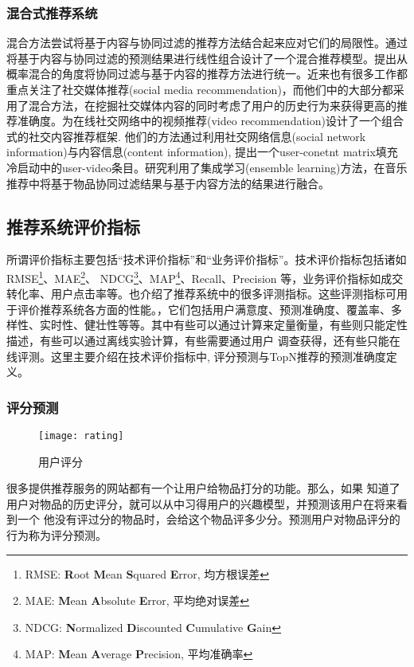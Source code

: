 \subsubsection{混合式推荐系统}
混合方法尝试将基于内容与协同过滤的推荐方法结合起来应对它们的局限性。\cite{burke2007hybrid}通过将基于内容与协同过滤的预测结果进行线性组合设计了一个混合推荐模型。\cite{schein2002methods}提出从概率混合的角度将协同过滤与基于内容的推荐方法进行统一。近来也有很多工作都重点关注了社交媒体推荐(social media recommendation)，而他们中的大部分都采用了混合方法，在挖掘社交媒体内容的同时考虑了用户的历史行为来获得更高的推荐准确度。\cite{wang2013joint}为在线社交网络中的视频推荐(video recommendation)设计了一个组合式的社交内容推荐框架. 他们的方法通过利用社交网络信息(social network information)与内容信息(content information), 提出一个user-conetnt matrix填充冷启动中的user-video条目。\cite{tiemann2007towards}研究利用了集成学习(ensemble learning)方法，在音乐推荐中将基于物品协同过滤结果与基于内容方法的结果进行融合。




\subsection{推荐系统评价指标}
所谓评价指标主要包括“技术评价指标”和“业务评价指标”。技术评价指标包括诸如 RMSE\footnote{RMSE: \textbf{R}oot \textbf{M}ean \textbf{S}quared \textbf{E}rror, 均方根误差}、MAE\footnote{MAE: \textbf{M}ean \textbf{A}bsolute \textbf{E}rror, 平均绝对误差}、
NDCG\footnote{NDCG: \textbf{N}ormalized \textbf{D}iscounted \textbf{C}umulative \textbf{G}ain}、MAP\footnote{MAP: \textbf{M}ean \textbf{A}verage  \textbf{P}recision, 平均准确率 }、Recall、Precision 等，业务评价指标如成交转化率、用户点击率等。\cite{xiangliang}也介绍了推荐系统中的很多评测指标。这些评测指标可用于评价推荐系统各方面的性能。，它们包括用户满意度、预测准确度、覆盖率、多样性、实时性、健壮性等等。其中有些可以通过计算来定量衡量，有些则只能定性描述，有些可以通过离线实验计算，有些需要通过用户
调查获得，还有些只能在线评测。这里主要介绍在技术评价指标中, 评分预测与TopN推荐的预测准确度定义。




\subsubsection{评分预测}
\begin{figure}[htbp]
	\label{gra1}
	\begin{center}
		\texttt{[image: rating]}
		\caption{用户评分}
	\end{center}
\end{figure}
很多提供推荐服务的网站都有一个让用户给物品打分的功能。那么，如果
知道了用户对物品的历史评分，就可以从中习得用户的兴趣模型，并预测该用户在将来看到一个
他没有评过分的物品时，会给这个物品评多少分。预测用户对物品评分的行为称为评分预测。

